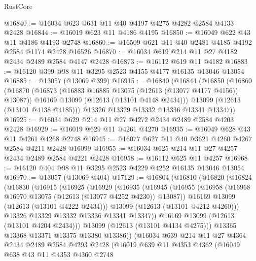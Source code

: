 \begin{lexlean}{RustCore}
\begin{coremodule}
@16840 := @16034 @623 @631 @11 @40 @4197 @4275 @4282 @2584 @4133 @2428
@16844 := @16019 @623 @11 @4186 @4195
@16850 := @16049 @622 @43 @11 @4186 @4193 @2748
@16860 := @16509 @621 @11 @40 @2481 @4185 @4192 @2584 @1174 @2428 @16526
@16870 := @16034 @619 @214 @11 @27 @4182 @2434 @2489 @2584 @4147 @2428
@16873 := @16112 @619 @11 @4182
@16883 := @16120 @399 @98 @11 @3295 @2523 @4155 @4177 @16135 @13046 @13054
@16885 := @13057 (@13069 @399)
@16915 := @16840
    (@16844
      (@16850
        (@16860
          (@16870
            (@16873 (@16883 @16885 @13075 (@12613 (@13077 @4177 @4156)) @13087))
            @16169
            @13099
            (@12613 (@13101 @4148 @2434)))
          @13099
          (@12613 (@13101 @4138 @4185)))
        @13326
        @13329
        @13332
        @13336
        @13341
        @13347))
@16925 := @16034 @629 @214 @11 @27 @4272 @2434 @2489 @2584 @4203 @2428
@16929 := @16019 @629 @11 @4261 @4270
@16935 := @16049 @628 @43 @11 @4261 @4268 @2748
@16945 := @16077 @627 @11 @40 @3621 @4260 @4267 @2584 @4211 @2428 @16099
@16955 := @16034 @625 @214 @11 @27 @4257 @2434 @2489 @2584 @4221 @2428
@16958 := @16112 @625 @11 @4257
@16968 := @16120 @404 @98 @11 @3295 @2523 @4229 @4252 @16135 @13046 @13054
@16970 := @13057 (@13069 @404)
@17129 := @16804
    (@16810
      (@16820
        (@16824
          (@16830
            (@16915
              (@16925
                (@16929
                  (@16935
                    (@16945
                      (@16955
                        (@16958 (@16968 @16970 @13075 (@12613 (@13077 @4252 @4230)) @13087))
                        @16169
                        @13099
                        (@12613 (@13101 @4222 @2434)))
                      @13099
                      (@12613 (@13101 @4212 @4260)))
                    @13326
                    @13329
                    @13332
                    @13336
                    @13341
                    @13347))
                @16169
                @13099
                (@12613 (@13101 @4204 @2434)))
              @13099
              (@12613 (@13101 @4134 @4275)))
            @13365
            @13368
            @13371
            @13375
            @13380
            @13386))
        (@16034
          @639
          @214
          @11
          @27
          @4364
          @2434
          @2489
          @2584
          @4293
          @2428
          (@16019
            @639
            @11
            @4353
            @4362
            (@16049
              @638
              @43
              @11
              @4353
              @4360
              @2748

\end{coremodule}
\end{lexlean}
